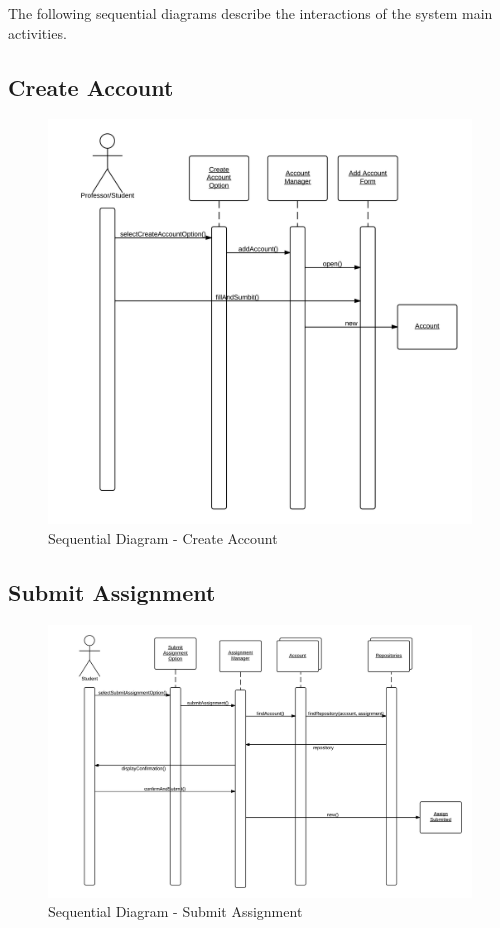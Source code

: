 \label{sec:seqs}
The following sequential diagrams describe the interactions of the system main activities.

\subsection*{Create Account}
\begin{figure}[H]
	\centering
	\includegraphics[width=\textwidth]{img/seqCreateAccount}
	\caption{Sequential Diagram - Create Account}
\end{figure}
\subsection*{Submit Assignment}
\begin{figure}[H]
	\centering
	\includegraphics[width=\textwidth]{img/seqSubmitAssign}
	\caption{Sequential Diagram - Submit Assignment}
\end{figure}
